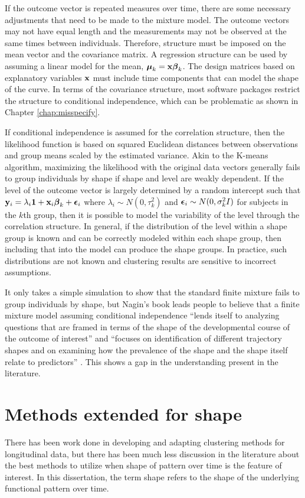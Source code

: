 If the outcome vector is repeated measures over time, there are some necessary adjustments that need to be made to the mixture model. The outcome vectors may not have equal length and the measurements may not be observed at the same times between individuals. Therefore, structure must be imposed on the mean vector and the covariance matrix. A regression structure can be used by assuming a linear model for the mean, $\boldsymbol\mu_k=\mathbf x \boldsymbol\beta_k$. The design matrices based on explanatory variables $\mathbf x$ must include time components that can model the shape of the curve.  In terms of the covariance structure, most software packages restrict the structure to conditional independence, which can be problematic as shown in Chapter \ref{chap:misspecify}.

If conditional independence is assumed for the correlation structure, then the likelihood function is based on squared Euclidean distances between observations and group means scaled by the estimated variance. Akin to the K-means algorithm, maximizing the likelihood with the original data vectors generally fails to group individuals by shape if shape and level are weakly dependent. If the level of the outcome vector is largely determined by a random intercept such that $\mathbf y_{i} = \lambda_{i}\mathbf 1+ \mathbf x_{i}\boldsymbol\beta_{k}  +\boldsymbol\epsilon_{i}$ where $\lambda_{i}\sim N(0,\tau^{2}_{k})$ and $\boldsymbol\epsilon_{i}\sim N(0,\sigma^{2}_{k}I)$ for subjects in the $k$th group, then it is possible to model the variability of the level through the correlation structure. In general, if the distribution of the level within a shape group is known and can be correctly modeled within each shape group, then including that into the model can produce the shape groups. In practice, such distributions are not known and clustering results are sensitive to incorrect assumptions.

It only takes a simple simulation to show that the standard finite mixture fails to group individuals by shape, but Nagin's book leads people to believe that a finite mixture model assuming conditional independence ``lends itself to analyzing questions that are framed in terms of the shape of the developmental course of the outcome of interest''  and  ``focuses on identification of different trajectory shapes and on examining how the prevalence of the shape and the shape itself relate to predictors'' \cite{nagin2005}. This shows a gap in the understanding present in the literature.

\section{Methods extended for shape}
There has been work done in developing and adapting clustering methods for longitudinal data, but there has been much less discussion in the literature about the best methods to utilize when shape of pattern over time is the feature of interest. In this dissertation, the term shape refers to the shape of the underlying functional pattern over time.

